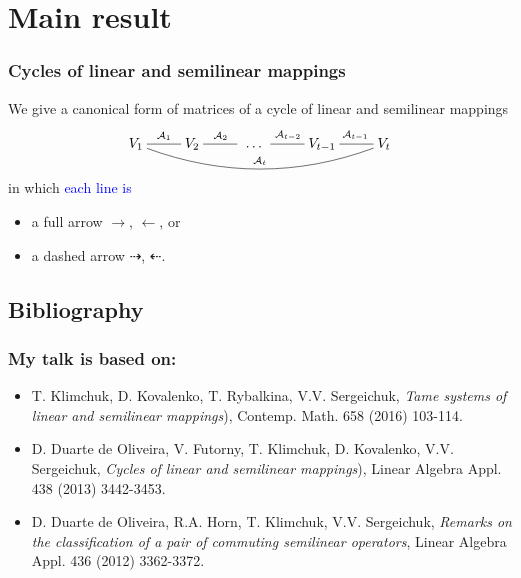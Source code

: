 \documentclass{beamer}
\begin{document}
\section{Main result}
\begin{frame}[t]
\frametitle{Cycles of linear and
semilinear mappings}


We give a canonical form of matrices of
a \alert{cycle of linear and semilinear
mappings}
\[
\xymatrix{
{V_1}
\ar@{-}@/_1.5pc/[rrrr]^{\mathcal A_t}
\ar@{-}[r]^{\mathcal A_1}&
V_2\ar@{-}[r]^{\mathcal A_2\ } &
{\ \dots\ }&{V_{t-1}}
\ar@{-}[l]_{\mathcal A_{t-2}}
\ar@{-}[r]^{\ \mathcal A_{t-1}}&{V_t}}
\]
in which \textcolor{blue}{each line is}
\begin{itemize}
  \item a full arrow
      \alert{$\longrightarrow$},
      \alert{$\longleftarrow$}, or
  \item a dashed arrow
      \alert{$\dashrightarrow$},
      \alert{$\dashleftarrow$}.
\end{itemize}


\end{frame}


\subsection{Bibliography}
\begin{frame}[t]
\frametitle{My talk is based on:}

\begin{itemize}

  \item \alert{T. Klimchuk,
  D. Kovalenko, T. Rybalkina,
  V.V. Sergeichuk}, {\it Tame systems
  of linear and semilinear mappings}),
   Contemp. Math. 658 (2016) 103-114.
\bigskip
\bigskip


  \item \alert{D. Duarte de
      Oliveira, V. Futorny, T.
      Klimchuk, D. Kovalenko, V.V.
      Sergeichuk}, {\it Cycles of
      linear and semilinear
      mappings}), Linear Algebra
      Appl. 438 (2013) 3442-3453.
\bigskip
\bigskip

  \item \alert{D. Duarte de
      Oliveira, R.A. Horn, T.
      Klimchuk, V.V. Sergeichuk},
      {\it Remarks on the
      classification of a pair of
      commuting semilinear
      operators}, Linear Algebra
      Appl. 436 (2012) 3362-3372.



\end{itemize}



\end{frame}
\end{document}
